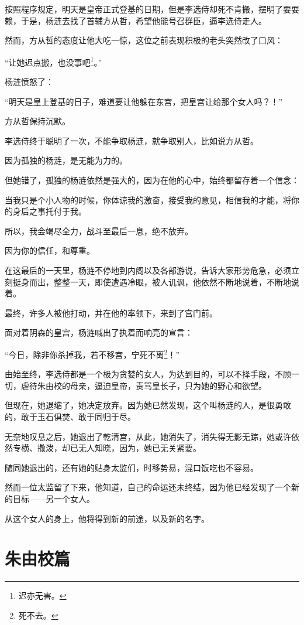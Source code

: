 \begin{multicols}{\theparacolNo}
按照程序规定，明天是皇帝正式登基的日期，但是李选侍却死不肯搬，摆明了要耍赖，于是，杨涟去找了首辅方从哲，希望他能号召群臣，逼李选侍走人。

然而，方从哲的态度让他大吃一惊，这位之前表现积极的老头突然改了口风：

“让她迟点搬，也没事吧\footnote{迟亦无害。}。”

杨涟愤怒了：

“明天是皇上登基的日子，难道要让他躲在东宫，把皇宫让给那个女人吗？！”

方从哲保持沉默。

李选侍终于聪明了一次，不能争取杨涟，就争取别人，比如说方从哲。

因为孤独的杨涟，是无能为力的。

但她错了，孤独的杨涟依然是强大的，因为在他的心中，始终都留存着一个信念：

当我只是个小人物的时候，你体谅我的激奋，接受我的意见，相信我的才能，将你的身后之事托付于我。

所以，我会竭尽全力，战斗至最后一息，绝不放弃。

因为你的信任，和尊重。

在这最后的一天里，杨涟不停地到内阁以及各部游说，告诉大家形势危急，必须立刻挺身而出，整整一天，即使遭遇冷眼，被人讥讽，他依然不断地说着，不断地说着。

最终，许多人被他打动，并在他的率领下，来到了宫门前。

面对着阴森的皇宫，杨涟喊出了执着而响亮的宣言：

“今日，除非你杀掉我，若不移宫，宁死不离\footnote{死不去。}！”

由始至终，李选侍都是一个极为贪婪的女人，为达到目的，可以不择手段，不顾一切，虐待朱由校的母亲，逼迫皇帝，责骂皇长子，只为她的野心和欲望。

但现在，她退缩了，她决定放弃。因为她已然发现，这个叫杨涟的人，是很勇敢的，敢于玉石俱焚、敢于同归于尽。

无奈地叹息之后，她退出了乾清宫，从此，她消失了，消失得无影无踪，她或许依然专横、撒泼，却已无人知晓，因为，她已无关紧要。

随同她退出的，还有她的贴身太监们，时移势易，混口饭吃也不容易。

然而一位太监留了下来，他知道，自己的命运还未终结，因为他已经发现了一个新的目标——另一个女人。

从这个女人的身上，他将得到新的前途，以及新的名字。
\ifnum{}
	\end{multicols}
\fi
\newpage

\chapter*{朱由校篇}
